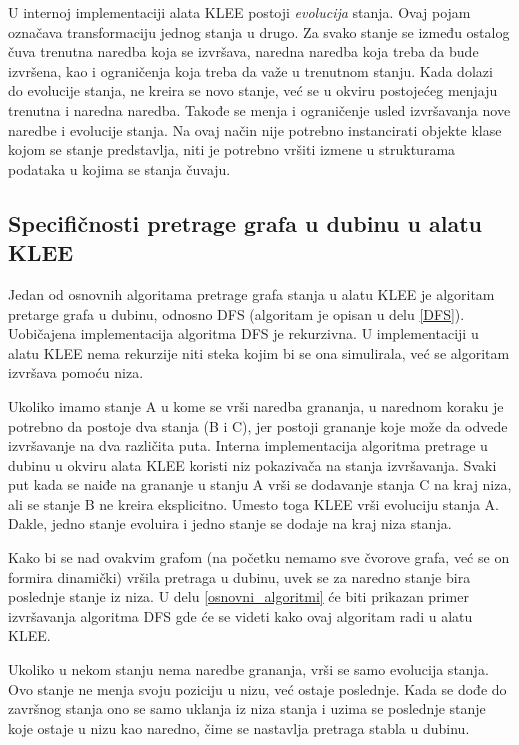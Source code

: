 \documentclass[12pt,oneside]{memoir}
\begin{document}
U internoj implementaciji alata KLEE postoji \textit{evolucija} stanja. Ovaj pojam označava transformaciju jednog stanja u drugo. Za svako stanje se između ostalog čuva trenutna naredba koja se izvršava, naredna naredba koja treba da bude izvršena, kao i ograničenja koja treba da važe u trenutnom stanju. Kada dolazi do evolucije stanja, ne kreira se novo stanje, već se u okviru postojećeg menjaju trenutna i naredna naredba. Takođe se menja i ograničenje usled izvršavanja nove naredbe i evolucije stanja. Na ovaj način nije potrebno instancirati objekte klase kojom se stanje predstavlja, niti je potrebno vršiti izmene u strukturama podataka u kojima se stanja čuvaju.

\subsection{Specifičnosti pretrage grafa u dubinu u alatu KLEE}
Jedan od osnovnih algoritama pretrage grafa stanja u alatu KLEE je algoritam pretarge grafa u dubinu, odnosno DFS (algoritam je opisan u delu \ref{DFS}). Uobičajena implementacija algoritma DFS je rekurzivna. U implementaciji u alatu KLEE nema rekurzije niti steka kojim bi se ona simulirala, već se algoritam izvršava pomoću niza.

Ukoliko imamo stanje A u kome se vrši naredba grananja, u narednom koraku je potrebno da postoje dva stanja (B i C), jer postoji grananje koje može da odvede izvršavanje na dva različita puta. Interna implementacija algoritma pretrage u dubinu u okviru alata KLEE koristi niz pokazivača na stanja izvršavanja. Svaki put kada se naiđe na grananje u stanju A vrši se dodavanje stanja C na kraj niza, ali se stanje B ne kreira eksplicitno. Umesto toga KLEE vrši evoluciju stanja A. Dakle, jedno stanje evoluira i jedno stanje se dodaje na kraj niza stanja. 

Kako bi se nad ovakvim grafom (na početku nemamo sve čvorove grafa, već se on formira dinamički) vršila pretraga u dubinu, uvek se za naredno stanje bira poslednje stanje iz niza. U delu \ref{osnovni_algoritmi} će biti prikazan primer izvršavanja algoritma DFS gde će se videti kako ovaj algoritam radi u alatu KLEE. 

Ukoliko u nekom stanju nema naredbe grananja, vrši se samo evolucija stanja. Ovo stanje ne menja svoju poziciju u nizu, već ostaje poslednje. Kada se dođe do završnog stanja ono se samo uklanja iz niza stanja i uzima se poslednje stanje koje ostaje u nizu kao naredno, čime se nastavlja pretraga stabla u dubinu. 
\end{document}
